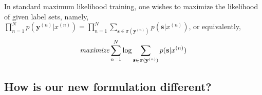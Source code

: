  
 In standard maximum likelihood training, one wishes to maximize the likelihood of given label sets, namely, $\prod_{n=1}^N p(\mathbf{y}^{(n)}|x^{(n)})=\prod_{n=1}^N \sum_{\mathbf{s}\in \pi(\mathbf{y}^{(n)})} p(\mathbf{s}|x^{(n)})$, or equivalently, 
\begin{align}
\textit{maximize} \sum_{n=1}^N \log \sum_{\mathbf{s}\in \pi(\mathbf{y}^{(n)})} p(\mathbf{s}|x^{(n)})
\label{eq:right_obj}
\end{align}




\subsection{How is our new formulation different?}

